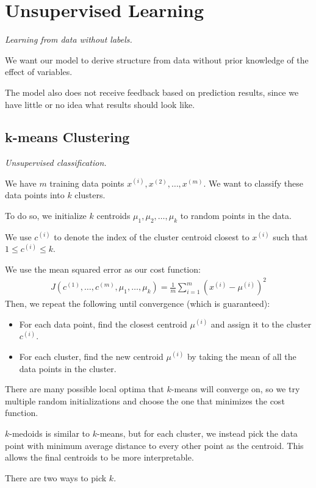 \section{Unsupervised Learning}
\emph{Learning from data without labels.}

We want our model to derive structure from data without prior knowledge of the effect of variables.

The model also does not receive feedback based on prediction results, since we have little or
no idea what results should look like.

\subsection{k-means Clustering}
\emph{Unsupervised classification.}

We have $m$ training data points $x^{(i)}, x^{(2)}, \dots, x^{(m)}$.
We want to classify these data points into $k$ clusters.

To do so, we initialize $k$ centroids $\mu_1, \mu_2, \dots, \mu_k$ to random points in the data.

We use $c^{(i)}$ to denote the index of the cluster centroid closest to $x^{(i)}$ such that
$1 \leq c^{(i)} \leq k$.

We use the mean squared error as our cost function:
\begin{align*}
    J(c^{(1)}, \dots, c^{(m)}, \mu_1, \dots, \mu_k) = \frac{1}{m} \sum_{i=1}^m \left( x^{(i)} - \mu^{(i)} \right)^2
\end{align*}
Then, we repeat the following until convergence (which is guaranteed):
\begin{itemize}
    \item For each data point, find the closest centroid $\mu^{(i)}$ and assign it to the cluster $c^{(i)}$.
    \item For each cluster, find the new centroid $\mu^{(i)}$ by taking the mean of all the data points in the cluster.
\end{itemize}

There are many possible local optima that $k$-means will converge on, so we try multiple
random initializations and choose the one that minimizes the cost function.

$k$-medoids is similar to $k$-means, but for each cluster, we instead pick the data point
with minimum average distance to every other point as the centroid.
This allows the final centroids to be more interpretable.

There are two ways to pick $k$.

